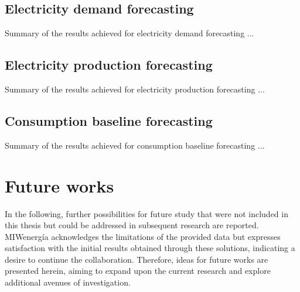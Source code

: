 

\vspace{0.1 cm}
\subsection{Electricity demand forecasting}
\label{sec:conclusionsdemand}
\vspace{0.1 cm}


Summary of the results achieved for electricity demand forecasting ...



\vspace{0.1 cm}
\subsection{Electricity production forecasting}
\label{sec:conclusionsproduction}
\vspace{0.1 cm}

Summary of the results achieved for electricity production forecasting ...


\vspace{0.1 cm}
\subsection{Consumption baseline forecasting}
\label{sec:conclusionsbaseline}
\vspace{0.1 cm}

Summary of the results achieved for consumption baseline forecasting ...


\section{Future works}
\label{sec:future}
\vspace{0.2 cm}


In the following, further possibilities for future study that were not included in this thesis but could be addressed in subsequent research are reported.
MIWenergía acknowledges the limitations of the provided data but expresses satisfaction with the initial results obtained through these solutions, indicating a desire to continue the collaboration.
Therefore, ideas for future works are presented herein, aiming to expand upon the current research and explore additional avenues of investigation.

